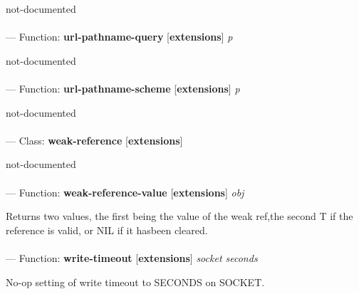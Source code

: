 \begin{adjustwidth}{5em}{5em}
not-documented
\end{adjustwidth}

\paragraph{}
\label{EXTENSIONS:URL-PATHNAME-QUERY}
--- Function: \textbf{url-pathname-query} [\textbf{extensions}] \textit{p}

\begin{adjustwidth}{5em}{5em}
not-documented
\end{adjustwidth}

\paragraph{}
\label{EXTENSIONS:URL-PATHNAME-SCHEME}
--- Function: \textbf{url-pathname-scheme} [\textbf{extensions}] \textit{p}

\begin{adjustwidth}{5em}{5em}
not-documented
\end{adjustwidth}

\paragraph{}
\label{EXTENSIONS:WEAK-REFERENCE}
--- Class: \textbf{weak-reference} [\textbf{extensions}] \textit{}

\begin{adjustwidth}{5em}{5em}
not-documented
\end{adjustwidth}

\paragraph{}
\label{EXTENSIONS:WEAK-REFERENCE-VALUE}
--- Function: \textbf{weak-reference-value} [\textbf{extensions}] \textit{obj}

\begin{adjustwidth}{5em}{5em}
Returns two values, the first being the value of the weak ref,the second T if the reference is valid, or NIL if it hasbeen cleared.
\end{adjustwidth}

\paragraph{}
\label{EXTENSIONS:WRITE-TIMEOUT}
--- Function: \textbf{write-timeout} [\textbf{extensions}] \textit{socket seconds}

\begin{adjustwidth}{5em}{5em}
No-op setting of write timeout to SECONDS on SOCKET.
\end{adjustwidth}

